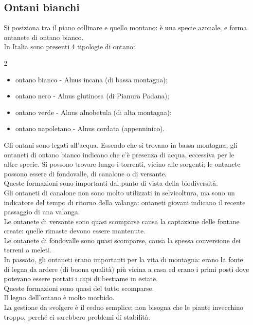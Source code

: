 \subsection{Ontani bianchi}
Si posiziona tra il piano collinare e quello montano: è una specie azonale, e forma ontanete di ontano bianco.\\
In Italia sono presenti 4 tipologie di ontano:
\begin{multicols}{2}
\begin{itemize}[nosep]
    \item ontano bianco - Alnus incana (di bassa montagna);
    \item ontano nero - Alnus glutinosa (di Pianura Padana);
    \item ontano verde - Alnus alnobetula (di alta montagna);
    \item ontano napoletano - Alnus cordata (appenninico).
\end{itemize}
\end{multicols}
Gli ontani sono legati all'acqua. Essendo che si trovano in bassa montagna, gli ontaneti di ontano bianco indicano che c'è presenza di  acqua, eccessiva per le altre specie. Si possono trovare lungo i torrenti, vicino alle sorgenti; le ontanete possono essere di fondovalle, di canalone o di versante.\\
Queste formazioni sono importanti dal punto di vista della biodiversità.\\
Gli ontaneti di canalone non sono molto utilizzati in selvicoltura, ma sono un indicatore del tempo di ritorno della valanga: ontaneti giovani indicano il recente passaggio di una valanga.\\
Le ontanete di versante sono quasi scomparse causa la captazione delle fontane create: quelle rimaste devono essere mantenute.\\
Le ontanete di fondovalle sono quasi scomparse, causa la spessa conversione dei terreni a meleti.\\
In passato, gli ontaneti erano importanti per la vita di montagna: erano la fonte di legna da ardere (di buona qualità) più vicina a casa ed erano i primi posti dove potevano essere portati i capi di bestiame in estate.\\
Queste formazioni sono quasi del tutto scomparse.\\
Il legno dell'ontano è molto morbido.\\
La gestione da svolgere è il ceduo semplice; non bisogna che le piante invecchino troppo, perché ci sarebbero problemi di stabilità.
